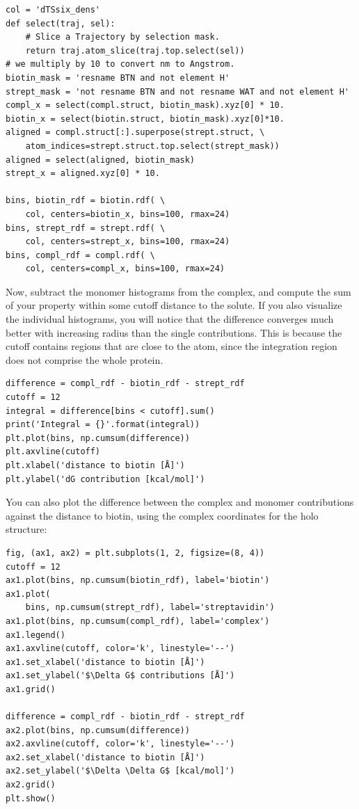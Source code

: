 \documentclass[9pt,tutorial]{livecoms}
\begin{document}
\begin{lstlisting}[style=python]
col = 'dTSsix_dens'
def select(traj, sel):
    # Slice a Trajectory by selection mask.
    return traj.atom_slice(traj.top.select(sel))
# we multiply by 10 to convert nm to Angstrom.
biotin_mask = 'resname BTN and not element H'
strept_mask = 'not resname BTN and not resname WAT and not element H'
compl_x = select(compl.struct, biotin_mask).xyz[0] * 10.
biotin_x = select(biotin.struct, biotin_mask).xyz[0]*10.
aligned = compl.struct[:].superpose(strept.struct, \
    atom_indices=strept.struct.top.select(strept_mask))
aligned = select(aligned, biotin_mask)
strept_x = aligned.xyz[0] * 10.

bins, biotin_rdf = biotin.rdf( \
    col, centers=biotin_x, bins=100, rmax=24)
bins, strept_rdf = strept.rdf( \
    col, centers=strept_x, bins=100, rmax=24)
bins, compl_rdf = compl.rdf( \
    col, centers=compl_x, bins=100, rmax=24)
\end{lstlisting}

Now, subtract the monomer histograms from the complex, and compute the sum of your property within some cutoff distance to the solute.
If you also visualize the individual histograms, you will notice that the difference converges much better with increasing radius than the single contributions.
This is because the cutoff contains regions that are close to the atom, since the integration region does not comprise the whole protein.

\begin{lstlisting}[style=python]
difference = compl_rdf - biotin_rdf - strept_rdf
cutoff = 12
integral = difference[bins < cutoff].sum()
print('Integral = {}'.format(integral))
plt.plot(bins, np.cumsum(difference))
plt.axvline(cutoff)
plt.xlabel('distance to biotin [Å]')
plt.ylabel('dG contribution [kcal/mol]')
\end{lstlisting}


You can also plot the difference between the complex and monomer contributions against the distance to biotin, using the complex coordinates for the holo structure:
\begin{lstlisting}[style=python]
fig, (ax1, ax2) = plt.subplots(1, 2, figsize=(8, 4))
cutoff = 12
ax1.plot(bins, np.cumsum(biotin_rdf), label='biotin')
ax1.plot(
    bins, np.cumsum(strept_rdf), label='streptavidin')
ax1.plot(bins, np.cumsum(compl_rdf), label='complex')
ax1.legend()
ax1.axvline(cutoff, color='k', linestyle='--')
ax1.set_xlabel('distance to biotin [Å]')
ax1.set_ylabel('$\Delta G$ contributions [Å]')
ax1.grid()

difference = compl_rdf - biotin_rdf - strept_rdf
ax2.plot(bins, np.cumsum(difference))
ax2.axvline(cutoff, color='k', linestyle='--')
ax2.set_xlabel('distance to biotin [Å]')
ax2.set_ylabel('$\Delta \Delta G$ [kcal/mol]')
ax2.grid()
plt.show()
\end{lstlisting}
\end{document}
